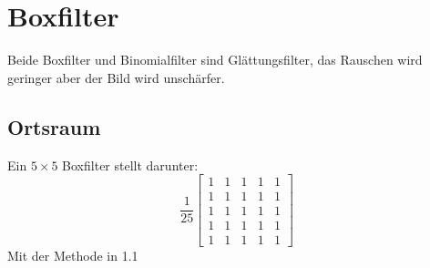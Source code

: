 \documentclass[12pt]{article}
\begin{document}
\section{Boxfilter}
Beide Boxfilter und Binomialfilter sind Glättungsfilter, das Rauschen wird geringer aber der Bild wird unschärfer.
\subsection{Ortsraum}
Ein $5 \times 5$ Boxfilter stellt darunter:
\begin{equation*}
\frac{1}{25} \begin{bmatrix}
1 & 1 & 1 & 1 & 1 \\
1 & 1 & 1 & 1 & 1 \\
1 & 1 & 1 & 1 & 1 \\
1 & 1 & 1 & 1 & 1 \\
1 & 1 & 1 & 1 & 1 
\end{bmatrix}
\end{equation*}
Mit der Methode in 1.1
\begin{figure}[ht]\centering
\end{figure}
\newpage
\end{document}
